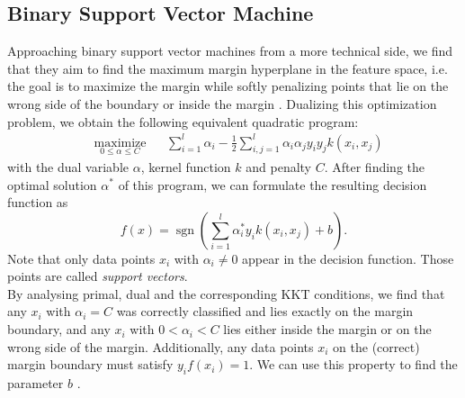 \subsection{Binary Support Vector Machine}


Approaching binary support vector machines from a more technical side, we find that they aim to find the maximum margin hyperplane in the feature space, i.e. the goal is to maximize the margin while softly penalizing points that lie on the wrong side of the boundary or inside the margin \cite{Bishop2006}. Dualizing this optimization problem, we obtain the following equivalent quadratic program:
\begin{equation*}\label{eq_dual}
\begin{aligned}
& \underset{0 \leq \alpha \leq C}{\text{maximize}}
& & \sum_{i = 1}^{l}\alpha_i - \frac{1}{2} \sum_{i, j = 1}^{l}\alpha_i  \alpha_j y_i y_j k(x_i, x_j)
\end{aligned}
\end{equation*}
with the dual variable $\alpha$, kernel function $k$ and penalty $C$.
After finding the optimal solution $\alpha^*$ of this program, we can formulate the resulting decision function as
\begin{equation*}
f(x) = \operatorname{sgn}\left(\sum_{i=1}^{l}\alpha^*_i y_i k(x_i,x_j)+b\right).
\end{equation*}
Note that only data points $x_i$ with $\alpha_i \neq 0$ appear in the decision function. Those points are called \textit{support vectors}.\\
By analysing primal, dual and the corresponding KKT conditions, we find that any $x_i$ with $\alpha_i = C$ was correctly classified and lies exactly on the margin boundary, and any $x_i$ with $0<\alpha_i < C$ lies either inside the margin or on the wrong side of the margin. Additionally, any data points $x_i$ on the (correct) margin boundary must satisfy $y_i f(x_i) = 1$. We can use this property to find the parameter $b$ \cite{Bishop2006}.

